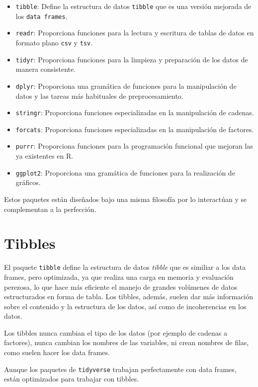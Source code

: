 \documentclass[
  a4paper,
]{scrreport}
\providecommand{\tightlist}{%
  \setlength{\itemsep}{0pt}\setlength{\parskip}{0pt}}\usepackage{longtable,booktabs,array}
\theoremstyle{definition}
\theoremstyle{definition}
\theoremstyle{remark}
\begin{document}
\begin{itemize}
\tightlist
\item
  \texttt{tibble}: Define la estructura de datos \texttt{tibble} que es
  una versión mejorada de los \texttt{data\ frames}.
\item
  \texttt{readr}: Proporciona funciones para la lectura y escritura de
  tablas de datos en formato plano \texttt{csv} y \texttt{tsv}.
\item
  \texttt{tidyr}: Proporciona funciones para la limpieza y preparación
  de los datos de manera consistente.
\item
  \texttt{dplyr}: Proporciona una gramática de funciones para la
  manipulación de datos y las tareas más habituales de preprocesamiento.
\item
  \texttt{stringr}: Proporciona funciones especializadas en la
  manipulación de cadenas.
\item
  \texttt{forcats}: Proporciona funciones especializadas en la
  manipulación de factores.
\item
  \texttt{purrr}: Proporciona funciones para la programación funcional
  que mejoran las ya existentes en R.
\item
  \texttt{ggplot2}: Proporciona una gramática de funciones para la
  realización de gráficos.
\end{itemize}

Estos paquetes están diseñados bajo una misma filosofía por lo
interactúan y se complementan a la perfección.

\section{Tibbles}\label{tibbles}

El paquete \texttt{tibble} define la estructura de datos \emph{tibble}
que es similiar a los data frames, pero optimizada, ya que realiza una
carga en memoria y evaluación perezosa, lo que hace más eficiente el
manejo de grandes volúmenes de datos estructurados en forma de tabla.
Los tibbles, además, suelen dar más información sobre el contenido y la
estructura de los datos, así como de incoherencias en los datos.

Los tibbles nunca cambian el tipo de los datos (por ejemplo de cadenas a
factores), nunca cambian los nombres de las variables, ni crean nombres
de filas, como suelen hacer los data frames.

Aunque los paquetes de \texttt{tidyverse} trabajan perfectamente con
data frames, están optimizados para trabajar con tibbles.
\end{document}
